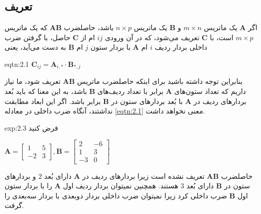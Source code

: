 \subsection{\textbf{تعریف}}
\label{subsec:2.2.1}
{
    \Large
    \begin{spacing}{1.5}
        اگر $\textbf{A}$ یک ماتریس $m\times n$ و $\textbf{B}$ یک ماتریس $n\times p$ باشد،
        حاصلضرب $\textbf{AB}$ که یک ماتریس $m\times p$ است، با $\textbf{C}$ تعریف می‌شود،
        که در آن ورودی $ij$ ام از $\textbf{C}$ حاصل، با گرفتن ضرب داخلی بردار ردیف $i$ ام $\textbf{A}$ با بردار ستون $j$ ام $\textbf{B}$ به دست می‌آید، یعنی

        \begin{eqtn}{eqtn:2.1}
            \centering
            $\textbf{C}_{ij}=\textbf{A}_{i,*}\cdot\textbf{B}_{*,j}$
        \end{eqtn}

        بنابراین توجه داشته باشید برای اینکه حاصلضرب ماتریس $\textbf{AB}$ تعریف شود، ما نیاز داریم که تعداد ستون‌های $\textbf{A}$ برابر با تعداد ردیف‌های $\textbf{B}$ باشد،
        به این معنا که باید بُعد بردارهای ردیف در $\textbf{A}$ با بُعد بردارهای ستون در $\textbf{B}$ برابر باشد.
        اگر این ابعاد مطابقت نداشتند، آنگاه ضرب داخلی در معادله \ref{eqtn:2.1} معنی نخواهد داشت.

        \begin{example}{exp:2.3}
            \Large
            فرض کنید

            \begin{center}
                $\textbf{A}=\begin{bmatrix}
                                1  & 5 \\
                                -2 & 3
                \end{bmatrix}, \textbf{B}=\begin{bmatrix}
                                              2  & -6 \\
                                              1  & 3  \\
                                              -3 & 0
                \end{bmatrix}$
            \end{center}

            حاصلضرب $\textbf{AB}$ تعریف نشده است زیرا بردارهای ردیف در $\textbf{A}$ دارای بُعد $2$ و بردارهای ستون در $\textbf{B}$ دارای بُعد $3$ هستند.
            همچنین نمیتوان بردار ردیف اول $\textbf{A}$ را با بردار ستون اول $\textbf{B}$  ضرب داخلی کرد زیرا نمیتوان ضرب داخلی بردار دو‌بعدی با بردار سه‌بعدی را گرفت.
        \end{example}


\end{spacing}}
